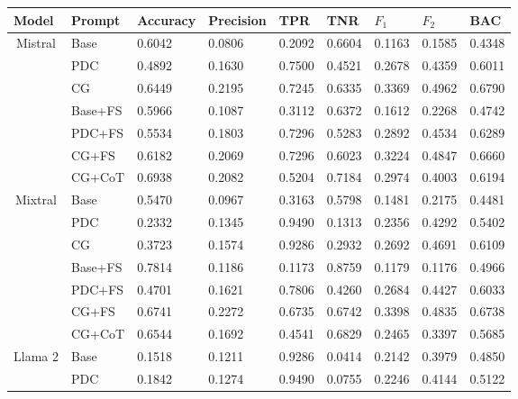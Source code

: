 \begin{table*}[]
\begin{tabular}{@{}cllllllll@{}}
\toprule
\multicolumn{1}{l}{\textbf{Model}} &
  \textbf{Prompt} &
  \textbf{Accuracy} &
  \textbf{Precision} &
  \textbf{TPR} &
  \textbf{TNR} &
  \textbf{$F_{1}$} &
  \textbf{$F_{2}$} &
  \textbf{BAC} \\ \midrule
\multirow{7}{*}{Mistral} & Base    & 0.6042 & 0.0806 & 0.2092 & 0.6604 & 0.1163 & 0.1585 & 0.4348 \\
                         & PDC     & 0.4892 & 0.1630 & 0.7500 & 0.4521 & 0.2678 & 0.4359 & 0.6011 \\
                         & CG      & 0.6449 & 0.2195 & 0.7245 & 0.6335 & 0.3369 & 0.4962 & 0.6790 \\
                         & Base+FS & 0.5966 & 0.1087 & 0.3112 & 0.6372 & 0.1612 & 0.2268 & 0.4742 \\
                         & PDC+FS  & 0.5534 & 0.1803 & 0.7296 & 0.5283 & 0.2892 & 0.4534 & 0.6289 \\
                         & CG+FS   & 0.6182 & 0.2069 & 0.7296 & 0.6023 & 0.3224 & 0.4847 & 0.6660 \\
                         & CG+CoT  & 0.6938 & 0.2082 & 0.5204 & 0.7184 & 0.2974 & 0.4003 & 0.6194 \\
\hline
\multirow{7}{*}{Mixtral} & Base    & 0.5470 & 0.0967 & 0.3163 & 0.5798 & 0.1481 & 0.2175 & 0.4481 \\
                         & PDC     & 0.2332 & 0.1345 & 0.9490 & 0.1313 & 0.2356 & 0.4292 & 0.5402 \\
                         & CG      & 0.3723 & 0.1574 & 0.9286 & 0.2932 & 0.2692 & 0.4691 & 0.6109 \\
                         & Base+FS & 0.7814 & 0.1186 & 0.1173 & 0.8759 & 0.1179 & 0.1176 & 0.4966 \\
                         & PDC+FS  & 0.4701 & 0.1621 & 0.7806 & 0.4260 & 0.2684 & 0.4427 & 0.6033 \\
                         & CG+FS   & 0.6741 & 0.2272 & 0.6735 & 0.6742 & 0.3398 & 0.4835 & 0.6738 \\
                         & CG+CoT  & 0.6544 & 0.1692 & 0.4541 & 0.6829 & 0.2465 & 0.3397 & 0.5685 \\
\hline
\multirow{6}{*}{Llama 2} & Base    & 0.1518 & 0.1211 & 0.9286 & 0.0414 & 0.2142 & 0.3979 & 0.4850 \\
                         & PDC     & 0.1842 & 0.1274 & 0.9490 & 0.0755 & 0.2246 & 0.4144 & 0.5122 \\

\end{tabular}
\end{table*}
